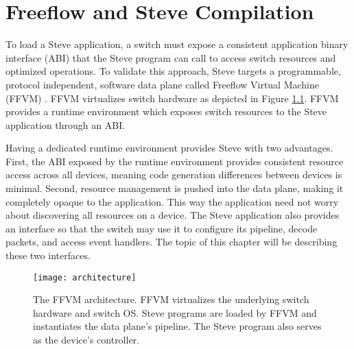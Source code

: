 \chapter{Freeflow and Steve Compilation} \label{ch:flowpath}

To load a Steve application, a switch must expose a consistent application binary interface (ABI) that the Steve program can call to access switch resources and optimized operations.
To validate this approach, Steve targets a programmable, protocol independent, software data plane called Freeflow Virtual Machine (FFVM) \cite{freeflow_software}. 
FFVM virtualizes switch hardware as depicted in Figure \ref{fig:architecture}. 
FFVM provides a runtime environment which exposes switch resources to the Steve application through an ABI. 

Having a dedicated runtime environment provides Steve with two advantages.
First, the ABI exposed by the runtime environment provides consistent resource access across all devices, meaning code generation differences between devices is minimal.
Second, resource management is pushed into the data plane, making it completely opaque to the application. This way the application need not worry about discovering all resources on a device.
The Steve application also provides an interface so that the switch may use it to configure its pipeline, decode packets, and access event handlers.
The topic of this chapter will be describing these two interfaces.



%
%

\begin{figure}[ht]
\centering
\texttt{[image: architecture]}
\caption{The FFVM architecture. FFVM virtualizes the underlying switch hardware and switch OS. Steve programs are loaded by FFVM and instantiates the data plane's pipeline. The Steve program also serves as the device's controller.}
\label{fig:architecture}
\end{figure}


